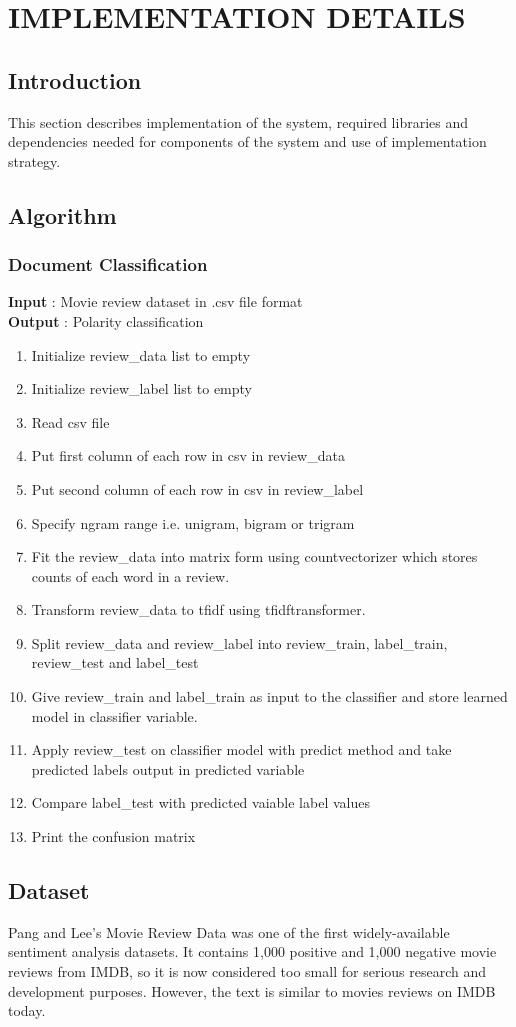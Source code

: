 \documentclass[oneside,a4paper,12pt]{pictreport}
\begin{document}
\chapter{IMPLEMENTATION DETAILS}
\section{Introduction}
This section describes implementation of the system, required libraries and dependencies needed for components of the system and use of implementation strategy.
\section{Algorithm}
\subsection{Document Classification}

\textbf{Input} : Movie review dataset in .csv file format \\
\textbf{Output} : Polarity classification \\

\begin{enumerate}
\item Initialize review\_data list to empty
\item Initialize review\_label list to empty
\item Read csv file
\item Put first column of each row in csv in review\_data
\item Put second column of each row in csv in review\_label
\item Specify ngram range i.e. unigram, bigram or trigram
\item Fit the review\_data into matrix form using countvectorizer
which stores counts of each word in a review.
\item Transform review\_data to tfidf using tfidftransformer.
\item Split review\_data and review\_label into review\_train, 
label\_train, review\_test and label\_test
\item Give review\_train and label\_train as input to the classifier
and store learned model in classifier variable.
\item Apply review\_test on classifier model with predict method
and take predicted labels output in predicted variable
\item Compare label\_test with predicted vaiable label values
\item Print the confusion matrix
\end{enumerate}\section{Dataset}
\hspace{1.1cm} Pang and Lee's Movie Review Data was one of the first widely-available sentiment analysis datasets.
It contains 1,000 positive and 1,000 negative movie reviews from IMDB, so it is now considered 
too small for serious research and development purposes. However, the text is similar to movies reviews on IMDB today.
\end{document}
